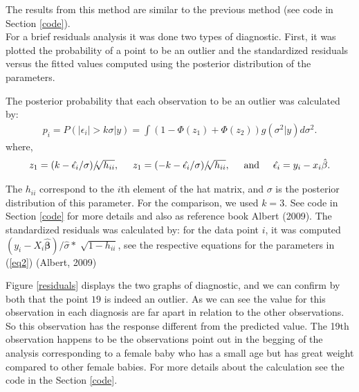 \documentclass[a4paper, 11pt]{article}
\begin{document}
The results from this method are similar to the previous method (see code in Section \ref{code}).\\

For a brief residuals analysis it was done two types of diagnostic. First, it was plotted the probability of a point to be an outlier and the standardized residuals versus the fitted values computed using the posterior distribution of the parameters. 

The posterior probability that each observation to be an outlier was calculated by:  
\begin{equation*}
\begin{array}{lclll}
p_i = P(|\epsilon_i|>k\sigma|y) = \displaystyle\int (1 - \Phi(z_1) + \Phi(z_2))g(\sigma^2|y)d\sigma^2.
\end{array}
\end{equation*}
\noindent
where, 
\begin{equation*}
\begin{array}{lclll}
z_1 = (k - \hat{\epsilon_i}/\sigma)/\sqrt[]{h_{ii}}, \hspace{0.5cm} z_1 = (-k - \hat{\epsilon_i}/\sigma)/\sqrt[]{h_{ii}}, \hspace{0.5cm} \mbox{and} \hspace{0.5cm} \hat{\epsilon_i} = y_i - x_i\hat{\beta}.
\end{array}
\end{equation*}

The $h_{ii}$ correspond to the $i$th element of the hat matrix, and $\sigma$ is the posterior distribution of this parameter. For the comparison, we used $k=3$. See code in Section \ref{code} for more details and also as reference book Albert (2009).
The  standardized residuals was calculated by: for the data point $i$, it was computed $(y_i - X_i\hat{\boldsymbol{\beta}})/\hat{\sigma}*\sqrt[]{1-h_{ii}}$, see the respective equations for the parameters in (\ref{eq2}) (Albert, 2009)

Figure \ref{residuals} displays the two graphs of diagnostic, and we can confirm by both that the point $19$ is indeed an outlier. As we can see the value for this observation in each diagnosis are far apart in relation to the other observations. So this observation has the response different from the predicted value. The 19th observation happens to be the observations point out in the begging of the analysis corresponding to a female baby who has a small age but has great weight compared to other female babies. For more details about the calculation see the code in the Section \ref{code}. 
\end{document}
